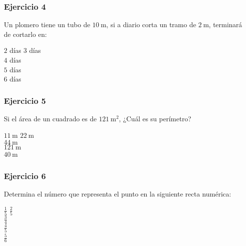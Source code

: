 \begin{frame}
\frametitle{Ejercicio 4}
Un plomero tiene un tubo de $\SI{10}{\meter}$, si a diario corta un tramo de $\SI{2}{\meter}$, terminará de cortarlo en:
\medskip
\begin{choices}
\choice $2$ días
\choice $3$ días \\
\choice $4$ días \\
\choice $5$ días \\
\choice $6$ días \\
\end{choices}
\pause
{}
\end{frame}
\begin{frame}
\frametitle{Ejercicio 5}
Si el área de un cuadrado es de $\SI{121}{\square\meter}$, ¿Cuál es su perímetro?
\medskip
\begin{choices}
\choice $\SI{11}{\meter}$
\choice $\SI{22}{\meter}$ \\
\choice $\SI{44}{\meter}$ \\
\choice $\SI{121}{\meter}$ \\
\choice $\SI{40}{\meter}$ \
\end{choices}
\pause
{}
\end{frame}
\begin{frame}
\frametitle{Ejercicio 6}
Determina el número que representa el punto en la siguiente recta numérica:
\\
\begin{figure}[H]
\centering
{}
\end{figure}
\begin{choices}
\choice $\frac{1}{5}$
\choice $\frac{2}{5}$ \\
\choice $\frac{3}{4}$ \\
\choice $\frac{4}{5}$ \\
\choice $\frac{5}{6}$ \
\end{choices}
\pause
{}
\end{frame}
